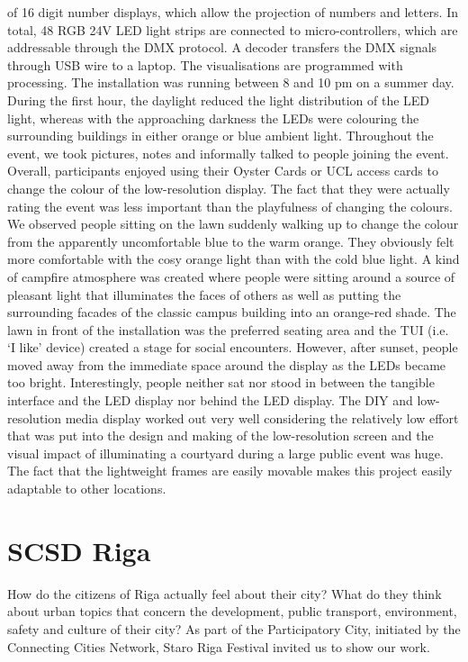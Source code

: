 of 16 digit number displays, which allow the projection of numbers and letters.
In total, 48 RGB 24V LED light strips are connected to micro-controllers, which
are addressable through the DMX protocol. A decoder transfers the DMX signals
through USB wire to a laptop. The visualisations are programmed with processing.
The installation was running between 8 and 10 pm on a summer day. During
the first hour, the daylight reduced the light distribution of the LED light, whereas
with the approaching darkness the LEDs were colouring the surrounding buildings
in either orange or blue ambient light.
Throughout the event, we took pictures, notes and informally talked to people
joining the event. Overall, participants enjoyed using their Oyster Cards or UCL
access cards to change the colour of the low-resolution display. The fact that they
were actually rating the event was less important than the playfulness of changing
the colours.
We observed people sitting on the lawn suddenly walking up to change the colour
from the apparently uncomfortable blue to the warm orange. They obviously
felt more comfortable with the cosy orange light than with the cold blue light.
A kind of campfire atmosphere was created where people were sitting around a
source of pleasant light that illuminates the faces of others as well as putting the
surrounding facades of the classic campus building into an orange-red shade.
The lawn in front of the installation was the preferred seating area and the TUI
(i.e. ‘I like’ device) created a stage for social encounters. However, after sunset,
people moved away from the immediate space around the display as the LEDs
became too bright. Interestingly, people neither sat nor stood in between the tangible
interface and the LED display nor behind the LED display.
The DIY and low-resolution media display worked out very well considering
the relatively low effort that was put into the design and making of the low-resolution
screen and the visual impact of illuminating a courtyard during a large public
event was huge. The fact that the lightweight frames are easily movable makes this
project easily adaptable to other locations.


\section{SCSD Riga}

How do the citizens of Riga actually feel about their city? What do they think about urban topics that concern the development, public transport, environment, safety and culture of their city? As part of the Participatory City, initiated by the Connecting Cities Network, Staro Riga Festival invited us to show our work. 

